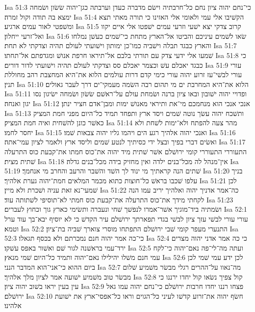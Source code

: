 Isa 51:3  כי־נחם יהוה ציון נחם כל־חרבתיה וישׂם מדברה כעדן וערבתה כגן־יהוה שׂשׂון ושׂמחה ימצא בה תודה וקול זמרה׃
Isa 51:4  הקשׁיבו אלי עמי ולאומי אלי האזינו כי תורה מאתי תצא ומשׁפטי לאור עמים ארגיע׃
Isa 51:5  קרוב צדקי יצא ישׁעי וזרעי עמים ישׁפטו אלי איים יקוו ואל־זרעי ייחלון׃
Isa 51:6  שׂאו לשׁמים עיניכם והביטו אל־הארץ מתחת כי־שׁמים כעשׁן נמלחו והארץ כבגד תבלה וישׁביה כמו־כן ימותון וישׁועתי לעולם תהיה וצדקתי לא תחת׃
Isa 51:7  שׁמעו אלי ידעי צדק עם תורתי בלבם אל־תיראו חרפת אנושׁ ומגדפתם אל־תחתו׃
Isa 51:8  כי כבגד יאכלם עשׁ וכצמר יאכלם סס וצדקתי לעולם תהיה וישׁועתי לדור דורים׃
Isa 51:9  עורי עורי לבשׁי־עז זרוע יהוה עורי כימי קדם דרות עולמים הלוא את־היא המחצבת רהב מחוללת תנין׃
Isa 51:10  הלוא את־היא המחרבת ים מי תהום רבה השׂמה מעמקי־ים דרך לעבר גאולים׃
Isa 51:11  ופדויי יהוה ישׁובון ובאו ציון ברנה ושׂמחת עולם על־ראשׁם שׂשׂון ושׂמחה ישׂיגון נסו יגון ואנחה׃
Isa 51:12  אנכי אנכי הוא מנחמכם מי־את ותיראי מאנושׁ ימות ומבן־אדם חציר ינתן׃
Isa 51:13  ותשׁכח יהוה עשׂך נוטה שׁמים ויסד ארץ ותפחד תמיד כל־היום מפני חמת המציק כאשׁר כונן להשׁחית ואיה חמת המציק׃
Isa 51:14  מהר צעה להפתח ולא־ימות לשׁחת ולא יחסר לחמו׃
Isa 51:15  ואנכי יהוה אלהיך רגע הים ויהמו גליו יהוה צבאות שׁמו׃
Isa 51:16  ואשׂים דברי בפיך ובצל ידי כסיתיך לנטע שׁמים וליסד ארץ ולאמר לציון עמי־אתה׃
Isa 51:17  התעוררי התעוררי קומי ירושׁלם אשׁר שׁתית מיד יהוה את־כוס חמתו את־קבעת כוס התרעלה שׁתית מצית׃
Isa 51:18  אין־מנהל לה מכל־בנים ילדה ואין מחזיק בידה מכל־בנים גדלה׃
Isa 51:19  שׁתים הנה קראתיך מי ינוד לך השׁד והשׁבר והרעב והחרב מי אנחמך׃
Isa 51:20  בניך עלפו שׁכבו בראשׁ כל־חוצות כתוא מכמר המלאים חמת־יהוה גערת אלהיך׃
Isa 51:21  לכן שׁמעי־נא זאת עניה ושׁכרת ולא מיין׃
Isa 51:22  כה־אמר אדניך יהוה ואלהיך יריב עמו הנה לקחתי מידך את־כוס התרעלה את־קבעת כוס חמתי לא־תוסיפי לשׁתותה עוד׃
Isa 51:23  ושׂמתיה ביד־מוגיך אשׁר־אמרו לנפשׁך שׁחי ונעברה ותשׂימי כארץ גוך וכחוץ לעברים׃
Isa 52:1  עורי עורי לבשׁי עזך ציון לבשׁי בגדי תפארתך ירושׁלם עיר הקדשׁ כי לא יוסיף יבא־בך עוד ערל וטמא׃
Isa 52:2  התנערי מעפר קומי שׁבי ירושׁלם התפתחו מוסרי צוארך שׁביה בת־ציון׃
Isa 52:3  כי־כה אמר יהוה חנם נמכרתם ולא בכסף תגאלו׃
Isa 52:4  כי כה אמר אדני יהוה מצרים ירד־עמי בראשׁנה לגור שׁם ואשׁור באפס עשׁקו׃
Isa 52:5  ועתה מה־לי־פה נאם־יהוה כי־לקח עמי חנם משׁלו יהילילו נאם־יהוה ותמיד כל־היום שׁמי מנאץ׃
Isa 52:6  לכן ידע עמי שׁמי לכן ביום ההוא כי־אני־הוא המדבר הנני׃
Isa 52:7  מה־נאוו על־ההרים רגלי מבשׂר משׁמיע שׁלום מבשׂר טוב משׁמיע ישׁועה אמר לציון מלך אלהיך׃
Isa 52:8  קול צפיך נשׂאו קול יחדו ירננו כי עין בעין יראו בשׁוב יהוה ציון׃
Isa 52:9  פצחו רננו יחדו חרבות ירושׁלם כי־נחם יהוה עמו גאל ירושׁלם׃
Isa 52:10  חשׂף יהוה את־זרוע קדשׁו לעיני כל־הגוים וראו כל־אפסי־ארץ את ישׁועת אלהינו׃
